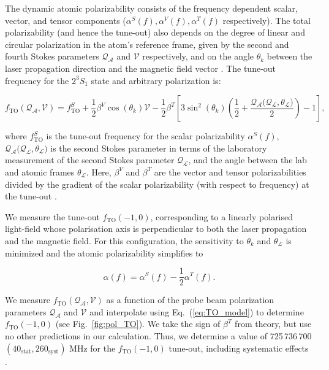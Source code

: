 \documentclass[aps,prl,
reprint,
superscriptaddress,
 amsmath,amssymb,
floatfix
]{revtex4-2}
\newcommand{\MetastableState}{2^{3\!}S_1}%
\begin{document}
The dynamic atomic polarizability consists of the frequency dependent scalar, vector, and tensor components (\(\alpha^S(f),\alpha^V(f),\alpha^T(f)\) respectively). The total polarizability (and hence the tune-out) also depends on the degree of linear and circular polarization in the atom's reference frame, given by the second and fourth Stokes parameters \(\mathcal{Q_{A}}\) and  \(\mathcal{V}\) respectively, and on the angle $\theta_k$ between the laser propagation direction and the magnetic field vector \cite{LeKien2013}. The tune-out frequency for the \(\MetastableState\) state and arbitrary polarization is: 

\begin{widetext}
    \begin{equation}
    f_{\mathrm{TO}}(\mathcal{Q_{A}}, \mathcal{V}) = f^{S}_{\mathrm{TO}} + \frac{1}{2} \beta^V \cos \left( \theta_k \right) \mathcal{V}  - \frac{1}{2} \beta^T \left[3 \sin^2\left( \theta_k \right) \left(\frac{1}{2} +  \frac{\mathcal{Q_{A}(Q_{L},\theta_{L}})}{2}\right) -1 \right],
    \label{eq:TO_model}
    \end{equation}
\end{widetext}
where \(f^{S}_{\mathrm{TO}}\) is the tune-out frequency for the scalar polarizability $\alpha^S(f)$, \(\mathcal{Q_{A}(Q_{L},\theta_{L}})\) is the second Stokes parameter in terms of the laboratory measurement of the second Stokes parameter \(\mathcal{Q_L}\), and the angle between the lab and atomic frames \(\mathcal{\theta_{L}}\). Here, \( \beta^V\) and  \(\beta^T\) are the vector and tensor polarizabilities divided by the gradient of the scalar polarizability (with respect to frequency) at the tune-out \cite{SOMs}.


We measure the tune-out \(f_{\mathrm{TO}}(-1,0)\), corresponding to a linearly polarised light-field whose polarisation axis is perpendicular to both the laser propagation and the magnetic field. For this configuration, the sensitivity to \(\theta_{k}\) and \(\theta_\mathcal{L}\) is minimized and the atomic polarizability simplifies to

\begin{equation}
    \alpha(f) = \alpha^S(f) - \frac{1}{2} \alpha^T(f). 
    \label{eq:polarizability_2}
\end{equation}

We measure \(f_{\mathrm{TO}}(\mathcal{Q_{A}}, \mathcal{V}) \) as a function of the probe beam polarization parameters \(\mathcal{Q_{A}}\) and \(\mathcal{V}\) and interpolate using Eq.~(\ref{eq:TO_model}) to determine \(f_{\mathrm{TO}}(-1,0)\) (see Fig.~\ref{fig:pol_TO}). We take the sign of \(\beta^T\) from theory, but use no other predictions in our calculation. Thus, we determine a value of  725\,736\,700\,$(40_{\mathrm{stat}},260_{\mathrm{syst}})$ MHz for the \(f_{\mathrm{TO}}(-1,0)\) tune-out, including systematic effects \cite{SOMs}.
\end{document}
